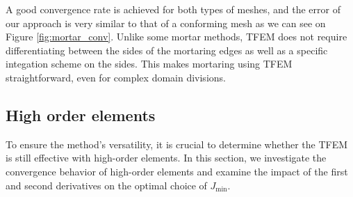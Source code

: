 \documentclass{article}
\theoremstyle{remark}
\begin{document}
A good convergence rate is achieved for both types of meshes, and the error of our approach is very similar to that of a conforming mesh as we can see on Figure \ref{fig:mortar_conv}. 
Unlike some mortar methods, TFEM does not require differentiating between the sides of the mortaring edges as well as a specific integation scheme on the sides. This makes mortaring using TFEM straightforward, even for complex domain divisions.

\subsection{High order elements}
    To ensure the method's versatility, it is crucial to determine whether the TFEM is still effective with high-order elements. In this section, we investigate the convergence behavior of high-order elements and examine the impact of the first and second derivatives on the optimal choice of $J_{\text{min}}$.
\end{document}
